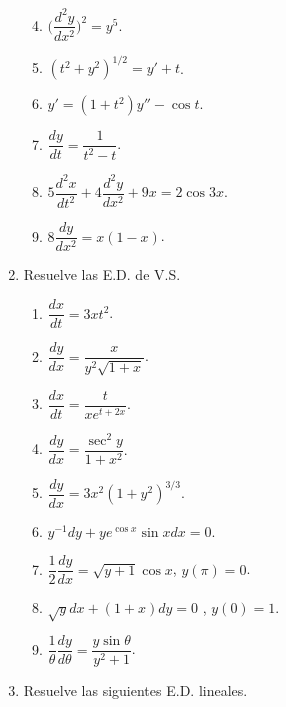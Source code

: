 \documentclass[letterpaper,10pt]{memoir}
\begin{document}
\begin{enumerate}
\begin{minipage}{0.3\linewidth}
\begin{enumerate}
				\setcounter{enumii}{3}
				\item \(\bigg(\dfrac{d^2y}{dx^2}\bigg) ^2 = y^5\).
				\item \((t^2+y^2) ^{1/2} =y' +t\).
				\item \(y' = (1+t^2) y'' - \cos t\).
			\end{enumerate}
		\end{minipage} 
		\begin{minipage}{0.3\linewidth}
			\begin{enumerate}
				\setcounter{enumii}{6}
				\item \(\dfrac{dy}{dt} = \dfrac{1}{t^2-t}\).
				\item \(5 \dfrac{d^2x}{dt^2} +4 \dfrac{d^2y}{dx^2} +9x = 2 \cos 3x\).
				\item \(8 \dfrac{dy}{dx^2} = x(1-x)\).
			\end{enumerate}
		\end{minipage} 
	\item Resuelve las E.D. de V.S. \\[2mm]
		\begin{minipage}{0.5\linewidth}
		\begin{enumerate}
			\item \(\dfrac{dx}{dt} = 3xt^2\).
			\item \(\dfrac{dy}{dx} = \dfrac{x}{y^2 \sqrt{1+x}}\).
			\item \(\dfrac{dx}{dt} = \dfrac{t}{xe^{t+2x}}\).
			\item \(\dfrac{dy}{dx} = \dfrac{\sec ^2y}{1+x^2}\).
		\end{enumerate}
		\end{minipage} 
		\begin{minipage}{0.5\linewidth}
		\begin{enumerate}
			\setcounter{enumii}{4}
			\item \(\dfrac{dy}{dx} = 3x^2(1+y^2) ^{3/3}\).
			\item \(y^{-1} dy +ye^{\cos x} \sin xdx=0\).
			\item \(\dfrac{1}{2} \dfrac{dy}{dx} = \sqrt{y+1} \cos x\), \(y(\pi) =0\).
			\item \(\sqrt{y} dx + (1+x) dy=0\) , \(y(0) =1\).
			\item \(\dfrac{1}{\theta} \dfrac{dy}{d \theta} = \dfrac{y \sin \theta}{y^2+1}\).
		\end{enumerate}
		\end{minipage} 
	\item Resuelve las siguientes E.D. lineales. \\[2mm]

\end{enumerate}
\end{document}
